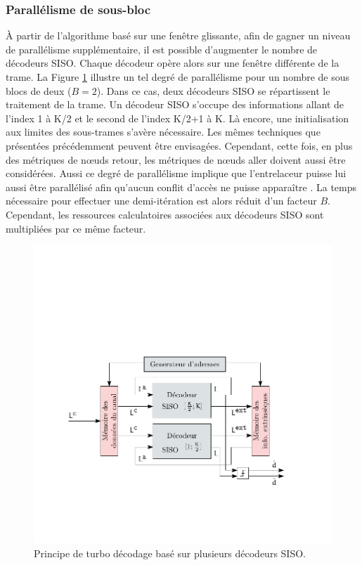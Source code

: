 \subsubsection{Parallélisme de sous-bloc}
À partir de l'algorithme basé sur une fenêtre glissante, afin de gagner un niveau de parallélisme supplémentaire, il est possible 
d'augmenter le nombre de décodeurs SISO. Chaque décodeur opère alors sur une fenêtre différente de la 
trame. La Figure \ref{fig:turbo_par} illustre un tel degré de parallélisme pour un nombre de sous blocs de deux ($B=2$).
Dans ce cas, deux décodeurs SISO se répartissent le traitement de la trame. Un décodeur SISO s'occupe des informations allant de l'index
1 à K/2 et le second de l'index K/2+1 à K. Là encore, une initialisation aux limites des sous-trames s'avère nécessaire. Les mêmes 
techniques que présentées précédemment peuvent être envisagées. Cependant, cette fois, en plus des métriques de nœuds
retour, les métriques de nœuds aller doivent aussi être considérées. Aussi ce degré de parallélisme implique que 
l'entrelaceur puisse lui aussi être parallélisé afin qu’aucun conflit d'accès ne puisse apparaître 
\cite{interleaver_conflict}. 
La temps nécessaire pour effectuer une demi-itération est alors réduit d'un facteur $B$. Cependant, les ressources 
calculatoires associées aux décodeurs SISO sont multipliées par ce même facteur.

\begin{figure}[!h]
	\centering
	\includegraphics{main/ch4_fig/ipe/parallel_2.pdf}
	\caption{Principe de turbo décodage basé  sur plusieurs décodeurs SISO. \label{fig:turbo_par}}
\end{figure} 

